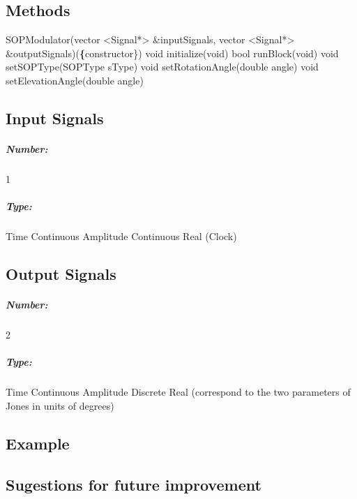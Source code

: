 \subsection*{Methods}

SOPModulator(vector <Signal*> \&inputSignals, vector <Signal*> \&outputSignals)(\textbf\{constructor\})
\bigbreak
void initialize(void)
\bigbreak
bool runBlock(void)
\bigbreak
void setSOPType(SOPType sType)
\bigbreak
void setRotationAngle(double angle)
\bigbreak
void setElevationAngle(double angle)
\bigbreak


\pagebreak

\subsection*{Input Signals}

\subparagraph*{Number:} 1

\subparagraph*{Type:} Time Continuous Amplitude Continuous Real (Clock)

\subsection*{Output Signals}

\subparagraph*{Number:} 2

\subparagraph*{Type:} Time Continuous Amplitude Discrete Real (correspond to the two parameters of Jones in units of degrees)

\subsection*{Example}

\subsection*{Sugestions for future improvement}
